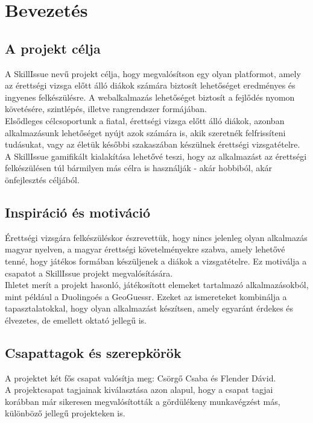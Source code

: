 \chapter{Bevezetés}
\section{A projekt célja}
A SkillIssue nevű projekt célja, hogy megvalósítson egy olyan platformot, amely az érettségi vizsga előtt álló diákok számára biztosít lehetőséget eredményes és ingyenes felkészülésre. A webalkalmazás lehetőséget biztosít a fejlődés nyomon követésére, szintlépés, illetve rangrendszer formájában.
\\
Elsődleges célcsoportunk a fiatal, érettségi vizsga előtt álló diákok, azonban alkalmazásunk lehetőséget nyújt azok számára is, akik szeretnék felfrissíteni tudásukat, vagy az életük későbbi szakaszában készülnek érettségi vizsgatételre. A SkillIssue gamifikált kialakítása lehetővé teszi, hogy az alkalmazást az érettségi felkészülésen túl bármilyen más célra is használják - akár hobbiból, akár önfejlesztés céljából.
\section{Inspiráció és motiváció}
Érettségi vizsgára felkészüléskor észrevettük, hogy nincs jelenleg olyan alkalmazás magyar nyelven, a magyar érettségi követelményekre szabva, amely lehetővé tenné, hogy játékos formában készüljenek a diákok a vizsgatételre. Ez motiválja a csapatot a SkillIssue projekt megvalósítására.\\
Ihletet merít a projekt hasonló, játékosított elemeket tartalmazó alkalmazásokból, mint például a Duolingo\footnotemark és a GeoGuessr\footnotemark. Ezeket az ismereteket kombinálja a tapasztalatokkal, hogy olyan alkalmazást készítsen, amely egyaránt érdekes és élvezetes, de emellett oktató jellegű is.
\section{Csapattagok és szerepkörök}
A projektet két fős csapat valósítja meg: Csörgő Csaba és Flender Dávid.
\\
A projektcsapat tagjainak kiválasztása azon alapul, hogy a csapat tagjai korábban már sikeresen megvalósították a gördülékeny munkavégzést más, különböző jellegű projekteken is.

